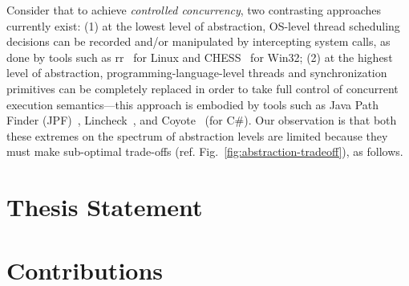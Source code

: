 Consider that to achieve \emph{controlled concurrency}, two contrasting approaches currently exist: (1) at the lowest level of abstraction, OS-level thread scheduling decisions can be recorded and/or manipulated by intercepting system calls, as done by tools such as rr~\cite{Ocallahan17-rr} for Linux and CHESS~\cite{Musuvathi08-chess} for Win32; (2) at the highest level of abstraction, programming-language-level threads and synchronization primitives can be completely replaced in order to take full control of concurrent execution semantics---this approach is embodied by tools such as Java Path Finder (JPF)~\cite{Visser03-jpf}, Lincheck~\cite{Koval23-lincheck}, and Coyote~\cite{Deligiannis23-coyote} (for C\#). Our observation is that both these extremes on the spectrum of abstraction levels are limited because they must make sub-optimal trade-offs (ref. Fig.~\ref{fig:abstraction-tradeoff}), as follows.



\section{Thesis Statement}

\section{Contributions}